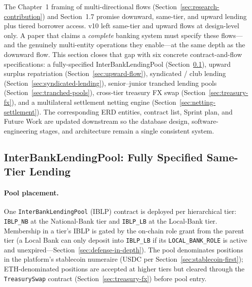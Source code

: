 \documentclass[12pt,a4paper]{report}
\begin{document}
The Chapter~1 framing of multi-directional flows (Section~\ref{sec:research-contribution}) and Section~1.7 promise downward, same-tier, and upward lending plus tiered borrower access. v10 left same-tier and upward flows at design-level only. A paper that claims a \emph{complete} banking system must specify these flows---and the genuinely multi-entity operations they enable---at the same depth as the downward flow. This section closes that gap with six concrete contract-and-flow specifications: a fully-specified InterBankLendingPool (Section~\ref{sec:interbank-pool}), upward surplus repatriation (Section~\ref{sec:upward-flow}), syndicated / club lending (Section~\ref{sec:syndicated-lending}), senior--junior tranched lending pools (Section~\ref{sec:tranched-pools}), cross-tier treasury FX swap (Section~\ref{sec:treasury-fx}), and a multilateral settlement netting engine (Section~\ref{sec:netting-settlement}). The corresponding ERD entities, contract list, Sprint plan, and Future Work are updated downstream so the database design, software-engineering stages, and architecture remain a single consistent system.

\subsection{InterBankLendingPool: Fully Specified Same-Tier Lending}
\label{sec:interbank-pool}

\paragraph{Pool placement.}
One \texttt{InterBankLendingPool} (IBLP) contract is deployed per hierarchical tier: \texttt{IBLP\_NB} at the National-Bank tier and \texttt{IBLP\_LB} at the Local-Bank tier. Membership in a tier's IBLP is gated by the on-chain role grant from the parent tier (a Local Bank can only deposit into \texttt{IBLP\_LB} if its \texttt{LOCAL\_BANK\_ROLE} is active and unexpired---Section~\ref{sec:defense-in-depth}). The pool denominates positions in the platform's stablecoin numeraire (USDC per Section~\ref{sec:stablecoin-first}); ETH-denominated positions are accepted at higher tiers but cleared through the \texttt{TreasurySwap} contract (Section~\ref{sec:treasury-fx}) before pool entry.
\end{document}
